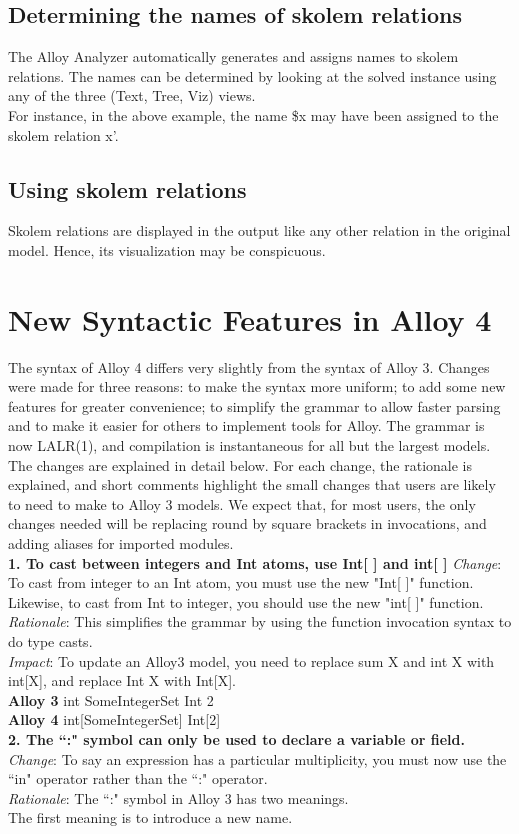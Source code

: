 \documentclass[a4paper,12pt]{extarticle}
\begin{document}
\subsection{Determining the names of skolem relations }
\label{determine skolem relations}
The Alloy Analyzer automatically generates and assigns names to skolem relations.
The names can be determined by looking at the solved instance using any of the three (Text, Tree, Viz) views.\\
For instance, in the above example, the name \$x may have been assigned to the skolem relation x'.
\subsection{Using skolem relations }
\label{Use of skolem relations}
Skolem relations are displayed in the output like any other relation in the original model. Hence, its visualization may be conspicuous.
\section{New Syntactic Features in Alloy 4 }
\label{Features of Alloy}
The syntax of Alloy 4 differs very slightly from the syntax of Alloy 3. Changes were made for three reasons: to make the syntax more uniform; to add some new features for greater convenience; to simplify the grammar to allow faster parsing and to make it easier for others to implement tools for Alloy. The grammar is now LALR(1), and compilation is instantaneous for all but the largest models. \\
The changes are explained in detail below. For each change, the rationale is explained, and short comments highlight the small changes that users are likely to need to make to Alloy 3 models. We expect that, for most users, the only changes needed will be replacing round by square brackets in invocations, and adding aliases for imported modules. \\
\textbf{1. To cast between integers and Int atoms, use Int[ ] and int[ ]}
\textit{Change}: To cast from integer to an Int atom, you must use the new "Int[ ]" function.\\
Likewise, to cast from Int to integer, you should use the new "int[ ]" function. \\
\textit{Rationale}: This simplifies the grammar by using the function invocation syntax to do type casts. \\
\textit{Impact}: To update an Alloy3 model, you need to replace sum X and int X with int[X], and replace Int X with Int[X]. \\
\textbf{Alloy 3}  int SomeIntegerSet  Int 2 \\
\textbf{Alloy 4}  int[SomeIntegerSet] Int[2] \\
\textbf{2. The ``:" symbol can only be used to declare a variable or field.} \\
\textit{Change}: To say an expression has a particular multiplicity, you must now use the ``in" operator rather than the ``:" operator. \\
\textit{Rationale}: The ``:" symbol in Alloy 3 has two meanings.\\
The first meaning is to introduce a new name.\\
\end{document}
